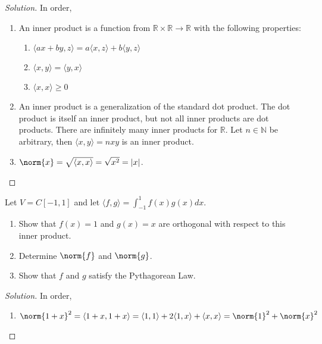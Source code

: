 \documentclass[crop=false,class=book,oneside]{standalone}                      %
\begin{document}
        \begin{proof}[Solution]
        In order,
        \begin{enumerate}
            \item An inner product is a function from $\mathbb{R}\times \mathbb{R}\rightarrow \mathbb{R}$ with the following properties:
            \begin{enumerate}
                \item $\langle ax+by,z\rangle = a\langle x,z\rangle+b\langle y,z\rangle$
                \item $\langle x,y\rangle = \langle y,x \rangle$
                \item $\langle x,x\rangle \geq 0$
            \end{enumerate}
            \item An inner product is a generalization of the standard dot product. The dot product is itself an inner product, but not all inner products are dot products. There are infinitely many inner products for $\mathbb{R}$. Let $n\in \mathbb{N}$ be arbitrary, then $\langle x,y \rangle = nxy$ is an inner product.
            \item $\norm{x} = \sqrt{\langle x,x \rangle } = \sqrt{x^2}= |x|$.
        \end{enumerate}
        \end{proof}
        \begin{problem}
        Let $V = C[-1,1]$ and let $\langle f,g\rangle = \int_{-1}^{1} f(x)g(x)dx$.
        \begin{enumerate}
            \item Show that $f(x)=1$ and $g(x) = x$ are orthogonal with respect to this inner product.
            \item Determine $\norm{f}$ and $\norm{g}$.
            \item Show that $f$ and $g$ satisfy the Pythagorean Law.
        \end{enumerate}
        \end{problem}
        \begin{proof}[Solution]
        In order,
        \begin{enumerate}
            \item $\norm{1+x}^2 = \langle 1+x,1+x\rangle = \langle 1,1\rangle + 2\langle 1,x \rangle + \langle x,x\rangle = \norm{1}^2 + \norm{x}^2$
        \end{enumerate}
        \end{proof}
\end{document}
